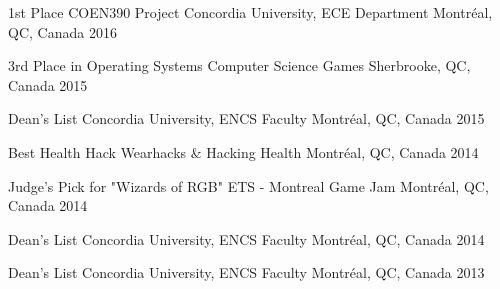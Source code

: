 



\begin{cvhonors}

  \cvhonor
    {1st Place COEN390 Project} %
    {Concordia University, ECE Department} %
    {Montréal, QC, Canada} %
    {2016} %

  \cvhonor
    {3rd Place in Operating Systems} %
    {Computer Science Games} %
    {Sherbrooke, QC, Canada} %
    {2015} %

  \cvhonor	
    {Dean's List} %
    {Concordia University, ENCS Faculty} %
    {Montréal, QC, Canada} %
    {2015} %

  \cvhonor
    {Best Health Hack} %
    {Wearhacks \& Hacking Health} %
    {Montréal, QC, Canada} %
    {2014} %
    
  \cvhonor
    {Judge's Pick for "Wizards of RGB"} %
    {ETS - Montreal Game Jam} %
    {Montréal, QC, Canada} %
    {2014} %
    
  \cvhonor	
    {Dean's List} %
    {Concordia University, ENCS Faculty} %
    {Montréal, QC, Canada} %
    {2014} %
    
  \cvhonor	
    {Dean's List} %
    {Concordia University, ENCS Faculty} %
    {Montréal, QC, Canada} %
    {2013} %







\end{cvhonors}
